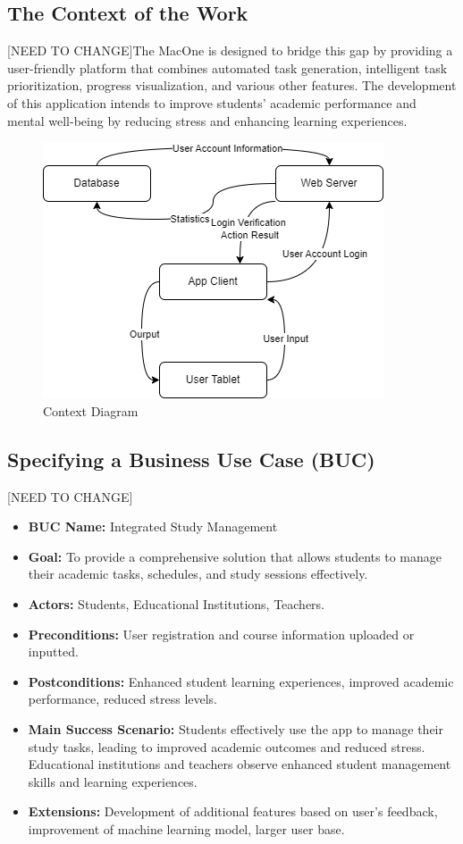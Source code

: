 \documentclass[12pt]{article}
\begin{document}
\subsection{The Context of the Work} 
[NEED TO CHANGE]The MacOne is designed to bridge this gap by providing a user-friendly platform that combines automated task generation, intelligent task prioritization, progress visualization, and various other features. The development of this application intends to improve students' academic performance and mental well-being by reducing stress and enhancing learning experiences. 
\begin{figure}[htbp]
    \centering
    \includegraphics[width=0.7\linewidth]{Context Diagram.drawio.png} 
    \caption{Context Diagram}
\end{figure}

\subsection{Specifying a Business Use Case (BUC)}
[NEED TO CHANGE]
\begin{itemize}
    \item \textbf{BUC Name:} Integrated Study Management
    \item \textbf{Goal:} To provide a comprehensive solution that allows students to manage their academic tasks, schedules, and study sessions effectively.
    \item \textbf{Actors:} Students, Educational Institutions, Teachers.
    \item \textbf{Preconditions:} User registration and course information uploaded or inputted.
    \item \textbf{Postconditions:} Enhanced student learning experiences, improved academic performance, reduced stress levels.
    \item \textbf{Main Success Scenario:} Students effectively use the app to manage their study tasks, leading to improved academic outcomes and reduced stress. Educational institutions and teachers observe enhanced student management skills and learning experiences.
    \item \textbf{Extensions:} Development of additional features based on user's feedback, improvement of machine learning model, larger user base.
\end{itemize}
\end{document}
